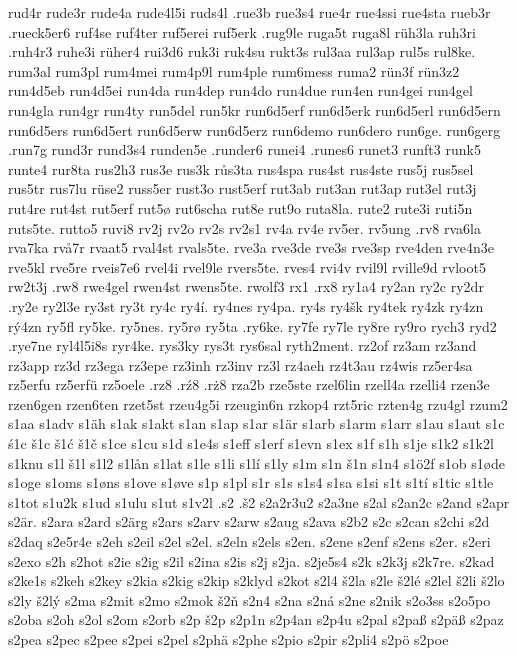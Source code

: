 {{rud4r
rude3r
rude4a
rude4l5i
ruds4l
.rue3b
rue3s4
rue4r
rue4ssi
rue4sta
rueb3r
.rueck5er6
ruf4se
ruf4ter
ruf5erei
ruf5erk
.rug9le
ruga5t
ruga8l
rüh3la
ruh3ri
.ruh4r3
ruhe3i
rüher4
rui3d6
ruk3i
ruk4su
rukt3s
rul3aa
rul3ap
rul5s
rul8ke.
rum3al
rum3pl
rum4mei
rum4p9l
rum4ple
rum6mess
ruma2
rün3f
rün3z2
run4d5eb
run4d5ei
run4da
run4dep
run4do
run4due
run4en
run4gei
run4gel
run4gla
run4gr
run4ty
run5del
run5kr
run6d5erf
run6d5erk
run6d5erl
run6d5ern
run6d5ers
run6d5ert
run6d5erw
run6d5erz
run6demo
run6dero
run6ge.
run6gerg
.run7g
rund3r
rund3s4
runden5e
.runder6
runei4
.runes6
runet3
runft3
runk5
runte4
rur8ta
rus2h3
rus3e
rus3k
růs3ta
rus4spa
rus4st
rus4ste
rus5j
rus5sel
rus5tr
rus7lu
rüse2
russ5er
rust3o
rust5erf
rut3ab
rut3an
rut3ap
rut3el
rut3j
rut4re
rut4st
rut5erf
rut5ø
rut6scha
rut8e
rut9o
ruta8la.
rute2
rute3i
ruti5n
ruts5te.
rutto5
ruvi8
rv2j
rv2o
rv2s
rv2s1
rv4a
rv4e
rv5er.
rv5ung
.rv8
rva6la
rva7ka
rvå7r
rvaat5
rval4st
rvals5te.
rve3a
rve3de
rve3s
rve3sp
rve4den
rve4n3e
rve5kl
rve5re
rveis7e6
rvel4i
rvel9le
rvers5te.
rves4
rvi4v
rvil9l
rville9d
rvloot5
rw2t3j
.rw8
rwe4gel
rwen4st
rwens5te.
rwolf3
rx1
.rx8
ry1a4
ry2an
ry2c
ry2dr
.ry2e
ry2l3e
ry3st
ry3t
ry4c
ry4í.
ry4nes
ry4pa.
ry4s
ry4šk
ry4tek
ry4zk
ry4zn
rý4zn
ry5fl
ry5ke.
ry5nes.
ry5rø
ry5ta
.ry6ke.
ry7fe
ry7le
ry8re
ry9ro
rych3
ryd2
.rye7ne
ryl4l5i8s
ryr4ke.
rys3ky
rys3t
rys6sal
ryth2ment.
rz2of
rz3am
rz3and
rz3app
rz3d
rz3ega
rz3epe
rz3inh
rz3inv
rz3l
rz4aeh
rz4t3au
rz4wis
rz5er4sa
rz5erfu
rz5erfü
rz5oele
.rz8
.rź8
.rż8
rza2b
rze5ste
rzel6lin
rzell4a
rzelli4
rzen3e
rzen6gen
rzen6ten
rzet5st
rzeu4g5i
rzeugin6n
rzkop4
rzt5ric
rzten4g
rzu4gl
rzum2
s1aa
s1adv
s1äh
s1ak
s1akt
s1an
s1ap
s1ar
s1är
s1arb
s1arm
s1arr
s1au
s1aut
s1c
ś1c
š1c
š1ć
š1č
s1ce
s1cu
s1d
s1e4s
s1eff
s1erf
s1evn
s1ex
s1f
s1h
s1je
s1k2
s1k2l
s1knu
s1l
š1l
s1l2
s1lån
s1lat
s1le
s1li
s1lí
s1ly
s1m
s1n
š1n
s1n4
s1ö2f
s1ob
s1øde
s1oge
s1oms
s1øns
s1ove
s1øve
s1p
s1pl
s1r
s1s
s1s4
s1sa
s1si
s1t
s1tí
s1tic
s1tle
s1tot
s1u2k
s1ud
s1ulu
s1ut
s1v2l
.s2
.š2
s2a2r3u2
s2a3ne
s2al
s2an2c
s2and
s2apr
s2är.
s2ara
s2ard
s2ärg
s2ars
s2arv
s2arw
s2aug
s2ava
s2b2
s2c
s2can
s2chi
s2d
s2daq
s2e5r4e
s2eh
s2eil
s2el
s2el.
s2eln
s2els
s2en.
s2ene
s2enf
s2ens
s2er.
s2eri
s2exo
s2h
s2hot
s2ie
s2ig
s2il
s2ina
s2is
s2j
s2ja.
s2je5s4
s2k
s2k3j
s2k7re.
s2kad
s2ke1s
s2keh
s2key
s2kia
s2kig
s2kip
s2klyd
s2kot
s2l4
š2la
s2le
š2lé
s2lel
š2li
š2lo
s2ly
š2lý
s2ma
s2mit
s2mo
s2mok
š2ň
s2n4
s2na
s2ná
s2ne
s2nik
s2o3ss
s2o5po
s2oba
s2oh
s2ol
s2om
s2orb
s2p
š2p
s2p1n
s2p4an
s2p4u
s2pal
s2paß
s2päß
s2paz
s2pea
s2pec
s2pee
s2pei
s2pel
s2phä
s2phe
s2pio
s2pir
s2pli4
s2pö
s2poe
}}
